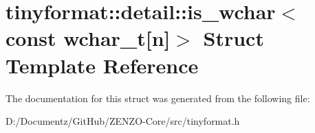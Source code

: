 \hypertarget{structtinyformat_1_1detail_1_1is__wchar_3_01const_01wchar__t[n]_4}{}\section{tinyformat\+::detail\+::is\+\_\+wchar$<$ const wchar\+\_\+t\mbox{[}n\mbox{]}$>$ Struct Template Reference}
\label{structtinyformat_1_1detail_1_1is__wchar_3_01const_01wchar__t[n]_4}


The documentation for this struct was generated from the following file\+:\begin{DoxyCompactItemize}
\item 
D\+:/\+Documentz/\+Git\+Hub/\+Z\+E\+N\+Z\+O-\/\+Core/src/tinyformat.\+h\end{DoxyCompactItemize}
